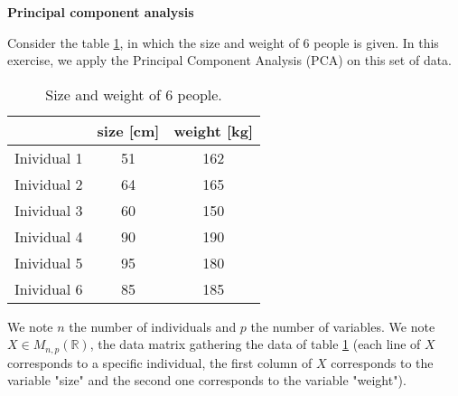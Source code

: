 \documentclass[12pt]{exam}
\begin{document}
\begin{questions}


  \question \textbf{Principal component analysis}
  \noaddpoints
  
  Consider the table \ref{table:data_exercise_1}, in which the size and weight of 6 people is given. In this exercise, we apply the Principal Component Analysis (PCA) on this set of data.
  
  \begin{table}[h]
  	\centering
  	\begin{tabular}{|l|c|c|}
  		\hline
  		&size [cm]    & weight [kg]  \\\hline
  		Inividual 1  & 51 & 162  \\\hline 
  		Inividual 2  & 64  & 165  
  		\\\hline
  		Inividual 3  &  60  & 150   \\\hline
  		Inividual 4  &  90  & 190   \\\hline
  		Inividual 5  &  95  & 180   \\\hline
  		Inividual 6  &  85  & 185   \\\hline
  	\end{tabular}
  	\caption{Size and weight of 6 people.}
  	\label{table:data_exercise_1}
  \end{table}

We note $n$ the number of individuals and $p$ the number of variables. We note $X \in M_{n,p}(\mathbb{R})$, the data matrix gathering the data of table \ref{table:data_exercise_1} (each line of $X$ corresponds to a specific individual, the first column of $X$ corresponds to the variable "size" and the second one corresponds to the variable "weight"). 


\end{questions}
\end{document}
